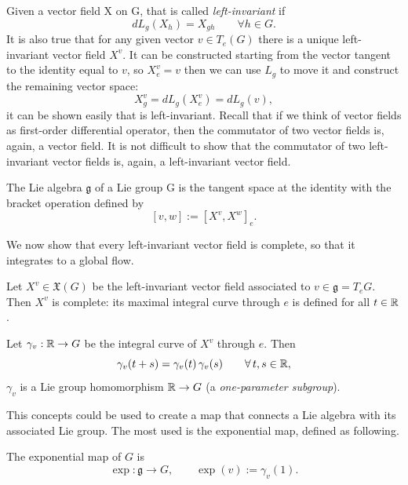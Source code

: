 Given a vector field X on G, that is called \textit{left-invariant} if
\[
	dL_g (X_h) = X_{gh} \qquad \forall h \in G.
\]
It is also true that for any given vector $v \in T_e(G)$ there is a unique left-invariant vector field $X^v$. It can be constructed starting from the vector tangent to the identity equal to $v$, so $X^v_e = v$ then we can use $L_g$ to move it and construct the remaining vector space:
\[
	X^v_g = dL_g (X^v_e) = dL_g(v),
\]
it can be shown easily that is left-invariant.
Recall that if we think of vector fields as first-order differential operator, then the commutator of two vector fields is, again, a vector field. It is not difficult to show that the commutator of two left-invariant vector fields is, again, a left-invariant vector field.

\begin{definition}\label{def:lie-gralg}
	The Lie algebra $\mathfrak{g}$ of a Lie group G is the tangent space at the identity with the bracket operation defined by
	\[
		[v, w] := [X^v, X^w]_e.
	\] 
\end{definition}

We now show that every left-invariant vector field is complete, so that it integrates to a global flow.

\begin{proposition}\label{prop:complete}
	Let $X^v \in \mathfrak{X}(G)$ be the left-invariant vector field associated to $v \in \mathfrak{g} = T_eG$. Then $X^v$ is complete: its maximal integral curve through $e$ is defined for all $t \in \mathbb{R}$.
\end{proposition}

\begin{proposition}\label{prop:one-param}
	Let $\gamma_v:\mathbb{R}\to G$ be the integral curve of $X^v$ through $e$. Then
	\[
	\gamma_v(t+s) = \gamma_v(t)\,\gamma_v(s) \qquad \forall\, t,s \in \mathbb{R},
	\]
	$\gamma_v$ is a Lie group homomorphism $\mathbb{R} \to G$ (a \emph{one-parameter subgroup}).
\end{proposition}

This concepts could be used to create a map that connects a Lie algebra with its associated Lie group. The most used is the exponential map, defined as following.

\begin{definition}\label{def:exp}
	The exponential map of $G$ is
	\[
	\exp: \mathfrak{g} \to G, \qquad \exp(v) := \gamma_v(1).
	\]
\end{definition}

